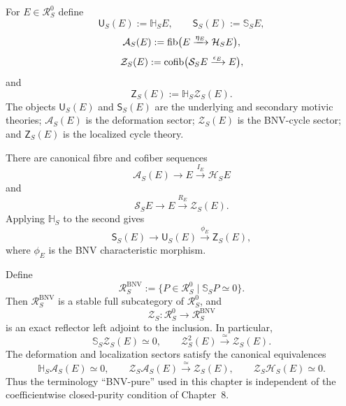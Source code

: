 \begin{definition}
\label{def:infinitesimal-bnv-invariants}
For $E\in\mathcal R_S^0$ define
\[
    \mathsf U_S(E):=\mathbb H_SE,
    \qquad
    \mathsf S_S(E):=\mathbb S_SE,
\]
\[
    \mathcal A_S(E)
    :=
    \operatorname{fib}\bigl(E\xrightarrow{\eta_E}\mathcal H_SE\bigr),
\]
\[
    \mathcal Z_S(E)
    :=
    \operatorname{cofib}\bigl(\mathcal S_SE\xrightarrow{\epsilon_E}E\bigr),
\]
and
\[
    \mathsf Z_S(E)
    :=
    \mathbb H_S\mathcal Z_S(E).
\]
The objects $\mathsf U_S(E)$ and $\mathsf S_S(E)$ are the underlying and
secondary motivic theories; $\mathcal A_S(E)$ is the deformation sector;
$\mathcal Z_S(E)$ is the BNV-cycle sector; and $\mathsf Z_S(E)$ is the
localized cycle theory.
\end{definition}

There are canonical fibre and cofiber sequences
\[
    \mathcal A_S(E)
    \longrightarrow
    E
    \xrightarrow{I_E}
    \mathcal H_SE
\]
and
\[
    \mathcal S_SE
    \longrightarrow
    E
    \xrightarrow{R_E}
    \mathcal Z_S(E).
\]
Applying $\mathbb H_S$ to the second gives
\[
    \mathsf S_S(E)
    \longrightarrow
    \mathsf U_S(E)
    \xrightarrow{\phi_E}
    \mathsf Z_S(E),
\]
where $\phi_E$ is the BNV characteristic morphism.

\begin{proposition}
\label{prop:infinitesimal-bnv-pure-cycles}
Define
\[
    \mathcal R_S^{\mathrm{BNV}}
    :=
    \{P\in\mathcal R_S^0\mid\mathbb S_SP\simeq0\}.
\]
Then \(\mathcal R_S^{\mathrm{BNV}}\) is a stable full subcategory of
\(\mathcal R_S^0\), and
\[
    \mathcal Z_S:\mathcal R_S^0
    \longrightarrow
    \mathcal R_S^{\mathrm{BNV}}
\]
is an exact reflector left adjoint to the inclusion.  In particular,
\[
    \mathbb S_S\mathcal Z_S(E)\simeq0,
    \qquad
    \mathcal Z_S^2(E)\xrightarrow{\simeq}\mathcal Z_S(E).
\]
The deformation and localization sectors satisfy the canonical equivalences
\[
    \boxed{
    \mathbb H_S\mathcal A_S(E)\simeq0,
    \qquad
    \mathcal Z_S\mathcal A_S(E)\xrightarrow{\simeq}\mathcal Z_S(E),
    \qquad
    \mathcal Z_S\mathcal H_S(E)\simeq0.
    }
\]
Thus the terminology ``BNV-pure'' used in this chapter is independent of the
coefficientwise closed-purity condition of Chapter~8.
\end{proposition}

